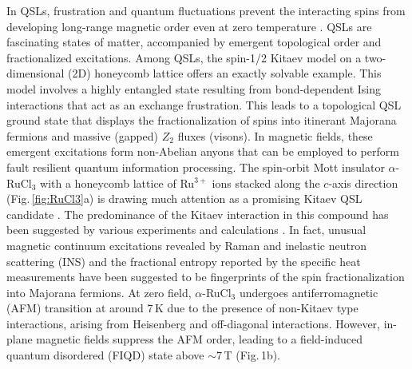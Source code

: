 \documentclass[twocolumn,preprintnumbers,prl,superscriptaddress,amsmath,amssymb,amsfonts]{revtex4}
\begin{document}
In QSLs, frustration and quantum fluctuations prevent the interacting spins from developing long-range magnetic order even at zero temperature \cite{balents2010spin}. QSLs are fascinating states of matter, accompanied by emergent topological order and fractionalized excitations. Among QSLs, the spin-1/2 Kitaev model on a two-dimensional (2D) honeycomb lattice \cite{kitaev2006anyons} offers an exactly solvable example. This model involves a highly entangled state resulting from bond-dependent Ising interactions that act as an exchange frustration. This leads to a topological QSL ground state that displays the fractionalization of spins into itinerant Majorana fermions and massive (gapped) $Z_2$ fluxes (visons). In magnetic fields, these emergent excitations form non-Abelian anyons that can be employed to perform fault resilient quantum information processing. The spin-orbit Mott insulator $\alpha$-RuCl$_3$ \cite{PhysRevB.90.041112} with a honeycomb lattice of Ru$^{3+}$ ions stacked along the $c$-axis direction (Fig.\,\ref{fig:RuCl3}a) is drawing much attention as a promising Kitaev QSL candidate \cite{PhysRevLett.102.017205,takagi2019kitaev}. The predominance of the Kitaev interaction in this compound has been suggested by various experiments and calculations \cite{motome2020hunting,winter2017models}. In fact, unusual magnetic continuum excitations revealed by Raman \cite{PhysRevLett.114.147201,nasu2016fermionic} and inelastic neutron scattering (INS) \cite{banerjee2016proximate,do2017majorana,banerjee2018excitations,PhysRevB.100.060405} and the fractional entropy reported by the specific heat measurements \cite{do2017majorana,PhysRevB.99.094415} have been suggested to be fingerprints of the spin fractionalization into Majorana fermions. At zero field, $\alpha$-RuCl$ _3$ undergoes antiferromagnetic (AFM) transition at around 7\,K \cite{PhysRevB.92.235119} due to the presence of non-Kitaev type interactions, arising from Heisenberg and off-diagonal interactions. However, in-plane magnetic fields suppress the AFM order, leading to a field-induced quantum disordered (FIQD) state above $\sim 7$\,T \cite{banerjee2018excitations,PhysRevB.103.174417} (Fig.\,1b).
\end{document}
